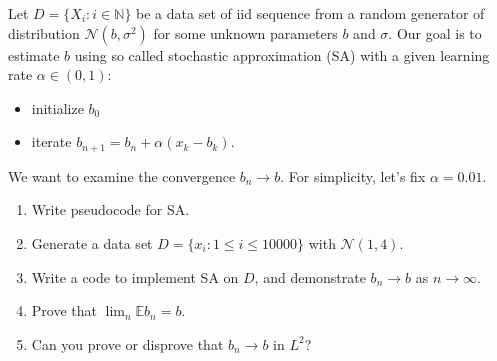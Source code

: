 \documentclass{article}
\begin{document}
Let $D = \{X_{i}: i\in \mathbb N\}$ be a data set of iid sequence from a random generator of distribution $\mathcal N(b, \sigma^{2})$ for some unknown parameters $b$ and $\sigma$.
Our goal is to estimate $b$ using so called stochastic approximation (SA)
with a given learning rate $\alpha \in (0,1)$:
\begin{itemize}
 \item initialize $b_{0}$
 \item iterate $b_{n+1} = b_{n} + \alpha (x_{k} - b_{k})$.
\end{itemize}
We want to examine the convergence $b_{n} \to b$.
For simplicity, let's fix $\alpha = 0.01$.
\begin{enumerate}
 \item Write pseudocode for SA.
 \item Generate a data set $D = \{x_{i}: 1\le i \le 10000\}$ with $\mathcal N (1, 4)$.
 \item Write a code to implement SA on $D$, and demonstrate $b_{n} \to b$ as $n\to \infty$.
 \item Prove that $ \lim_{n}\mathbb E b_{n} = b$.
 \item Can you prove or disprove that $b_{n} \to b$ in $L^{2}$? 
\end{enumerate}
\end{document}
